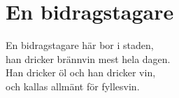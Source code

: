 \section{En bidragstagare}
En bidragstagare här bor i staden,\\
han dricker brännvin mest hela dagen.\\
Han dricker öl och han dricker vin,\\
och kallas allmänt för fyllesvin.\\